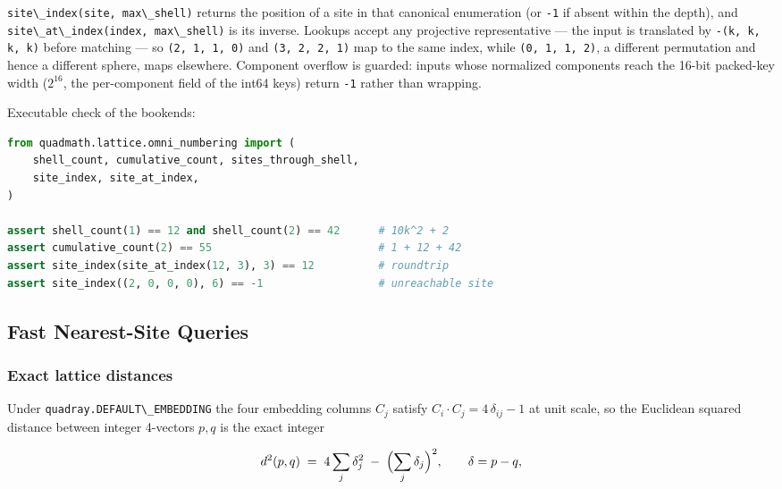 \documentclass[
  10pt,
]{article}
\newcommand{\passthrough}[1]{#1}
\begin{document}
\passthrough{\lstinline!site\_index(site, max\_shell)!} returns the
position of a site in that canonical enumeration (or
\passthrough{\lstinline!-1!} if absent within the depth), and
\passthrough{\lstinline!site\_at\_index(index, max\_shell)!} is its
inverse. Lookups accept any projective representative --- the input is
translated by \passthrough{\lstinline!-(k, k, k, k)!} before matching
--- so \passthrough{\lstinline!(2, 1, 1, 0)!} and
\passthrough{\lstinline!(3, 2, 2, 1)!} map to the same index, while
\passthrough{\lstinline!(0, 1, 1, 2)!}, a different permutation and
hence a different sphere, maps elsewhere. Component overflow is guarded:
inputs whose normalized components reach the 16-bit packed-key width
(\(2^{16}\), the per-component field of the int64 keys) return
\passthrough{\lstinline!-1!} rather than wrapping.

Executable check of the bookends:

\begin{lstlisting}[language=Python]
from quadmath.lattice.omni_numbering import (
    shell_count, cumulative_count, sites_through_shell,
    site_index, site_at_index,
)

assert shell_count(1) == 12 and shell_count(2) == 42      # 10k^2 + 2
assert cumulative_count(2) == 55                          # 1 + 12 + 42
assert site_index(site_at_index(12, 3), 3) == 12          # roundtrip
assert site_index((2, 0, 0, 0), 6) == -1                  # unreachable site
\end{lstlisting}

\subsection{Fast Nearest-Site Queries}\label{fast-nearest-site-queries}

\subsubsection{Exact lattice distances}\label{exact-lattice-distances}

Under \passthrough{\lstinline!quadray.DEFAULT\_EMBEDDING!} the four
embedding columns \(C_j\) satisfy \(C_i \cdot C_j = 4\,\delta_{ij} - 1\)
at unit scale, so the Euclidean squared distance between integer
4-vectors \(p, q\) is the exact integer

\begin{equation}\label{eq:lattice-distance-identity}
d^{2}(p, q) \;=\; 4 \sum_{j} \delta_j^{2} \;-\; \Bigl(\sum_{j} \delta_j\Bigr)^{2},
\qquad \delta = p - q,
\end{equation}
\end{document}

